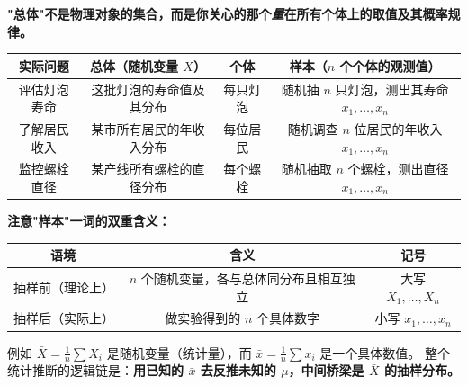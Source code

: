 \begin{remark}[总体、个体、样本：用三组例子建立直觉]
\textbf{"总体"不是物理对象的集合，而是你关心的那个\emph{量}在所有个体上的取值及其概率规律。}

\begin{center}
\renewcommand{\arraystretch}{1.3}
\begin{tabular}{c|c|c|c}
\toprule
\textbf{实际问题} & \textbf{总体（随机变量 $X$）} & \textbf{个体} & \textbf{样本（$n$ 个个体的观测值）} \\
\midrule
评估灯泡寿命   & 这批灯泡的寿命值及其分布  & 每只灯泡   & 随机抽 $n$ 只灯泡，测出其寿命 $x_1,\dots,x_n$ \\
了解居民收入   & 某市所有居民的年收入分布    & 每位居民   & 随机调查 $n$ 位居民的年收入 $x_1,\dots,x_n$ \\
监控螺栓直径   & 某产线所有螺栓的直径分布    & 每个螺栓   & 随机抽取 $n$ 个螺栓，测出直径 $x_1,\dots,x_n$ \\
\bottomrule
\end{tabular}
\end{center}

\medskip
\textbf{注意"样本"一词的双重含义：}

\begin{center}
\begin{tabular}{c|c|c}
\toprule
\textbf{语境} & \textbf{含义} & \textbf{记号} \\
\midrule
抽样前（理论上） & $n$ 个随机变量，各与总体同分布且相互独立 & 大写 $X_1,\dots,X_n$ \\
抽样后（实际上） & 做实验得到的 $n$ 个具体数字              & 小写 $x_1,\dots,x_n$ \\
\bottomrule
\end{tabular}
\end{center}

例如 $\bar{X} = \frac{1}{n}\sum X_i$ 是随机变量（统计量），而 $\bar{x} = \frac{1}{n}\sum x_i$ 是一个具体数值。
整个统计推断的逻辑链是：\textbf{用已知的 $\bar{x}$ 去反推未知的 $\mu$，中间桥梁是 $\bar{X}$ 的抽样分布。}
\end{remark}

